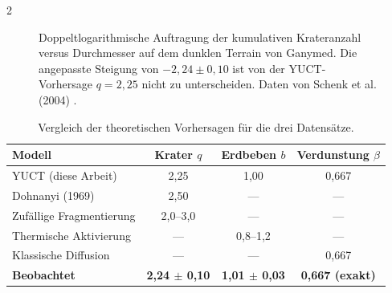 \documentclass[11pt,a4paper]{article}
\begin{document}
\begin{multicols}{2}
		\begin{figure}[htbp]
			\centering
			\caption{Doppeltlogarithmische Auftragung der kumulativen Krateranzahl versus Durchmesser auf dem dunklen Terrain von Ganymed. Die angepasste Steigung von \(-2,24 \pm 0,10\) ist von der YUCT-Vorhersage \(q = 2,25\) nicht zu unterscheiden. Daten von Schenk et al. (2004) \cite{Schenk2004}.}
			\label{fig:craters}
		\end{figure}
		
		\begin{table}[htbp]
			\centering
			\caption{Vergleich der theoretischen Vorhersagen für die drei Datensätze.}
			\label{tab:comparison}
			\begin{tabular}{lccc}
				\toprule
				\textbf{Modell} & \textbf{Krater $q$} & \textbf{Erdbeben $b$} & \textbf{Verdunstung $\beta$} \\
				\midrule
				YUCT (diese Arbeit) & 2,25 & 1,00 & 0,667 \\
				Dohnanyi (1969) \cite{Dohnanyi1969} & 2,50 & — & — \\
				Zufällige Fragmentierung & 2,0–3,0 & — & — \\
				Thermische Aktivierung & — & 0,8–1,2 & — \\
				Klassische Diffusion & — & — & 0,667 \\
				\textbf{Beobachtet} & \textbf{2,24 $\pm$ 0,10} & \textbf{1,01 $\pm$ 0,03} & \textbf{0,667 (exakt)} \\
				\bottomrule
			\end{tabular}
		\end{table}
		

\end{multicols}
\end{document}
